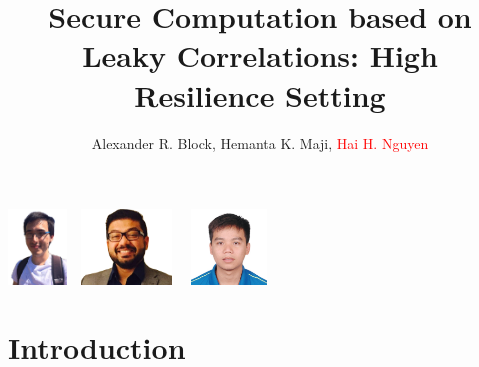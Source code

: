 \documentclass[
  xcolor={svgnames}, 
  hyperref={citecolor=DeepPink4,linkcolor=DarkRed,urlcolor=DarkBlue},
]{beamer}
\title[]{Secure Computation based on Leaky Correlations: High Resilience Setting}
\author[BMN]{Alexander R. Block, Hemanta K. Maji, \textcolor{red}{Hai H. Nguyen}}
\institute{Purdue University}
\let\otp\titlepage
\renewcommand{\titlepage}{\otp\addtocounter{framenumber}{-1}}
\begin{document}
\begin{frame}[plain]
\titlepage

\begin{center}
	\includegraphics[height=2cm, keepaspectratio]{alex}\ \
	\includegraphics[height=2cm, keepaspectratio]{maji} \ \ 
	\includegraphics[height=2cm, keepaspectratio]{hai}
\end{center}
\end{frame}



\section{Introduction}

%













\end{document}
